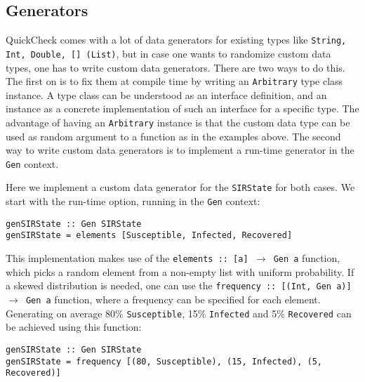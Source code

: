 \subsection{Generators}
QuickCheck comes with a lot of data generators for existing types like \texttt{String, Int, Double, [] (List)}, but in case one wants to randomize custom data types, one has to write custom data generators. There are two ways to do this. The first on is to fix them at compile time by writing an \texttt{Arbitrary} type class instance. A type class can be understood as an interface definition, and an instance as a concrete implementation of such an interface for a specific type. The advantage of having an \texttt{Arbitrary} instance is that the custom data type can be used as random argument to a function as in the examples above. The second way to write custom data generators is to implement a run-time generator in the \texttt{Gen} context.

Here we implement a custom data generator for the \texttt{SIRState} for both cases. We start with the run-time option, running in the \texttt{Gen} context:

\begin{footnotesize}
\begin{verbatim}
genSIRState :: Gen SIRState
genSIRState = elements [Susceptible, Infected, Recovered]
\end{verbatim}
\end{footnotesize}

This implementation makes use of the \texttt{elements :: [a] $\rightarrow$ Gen a} function, which picks a random element from a non-empty list with uniform probability. If a skewed distribution is needed, one can use the \texttt{frequency :: [(Int, Gen a)] $\rightarrow$ Gen a} function, where a frequency can be specified for each element. Generating on average 80\% \texttt{Susceptible}, 15\% \texttt{Infected} and 5\% \texttt{Recovered} can be achieved using this function:

\begin{footnotesize}
\begin{verbatim}
genSIRState :: Gen SIRState
genSIRState = frequency [(80, Susceptible), (15, Infected), (5, Recovered)]
\end{verbatim}
\end{footnotesize}

